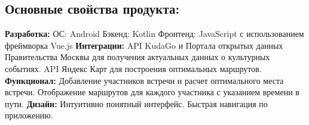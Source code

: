 \documentclass[a4paper,12pt]{extarticle}
\begin{document}
\subsection{Основные свойства продукта:}
\noindent
\textbf{Разработка:} 
\newline
ОС: Android
\newline
Бэкенд: Kotlin
\newline
Фронтенд: JavaScript с использованием фреймворка Vue.js
\newline
\textbf{Интеграции:}
\newline
API KudaGo и Портала открытых данных Правительства Москвы для получения актуальных данных о культурных 
событиях.
\newline
API Яндекс Карт для построения оптимальных маршрутов.
\newline
\textbf{Функционал:}
\newline
Добавление участников встречи и расчет оптимального места встречи.
\newline
Отображение маршрутов для каждого участника с указанием 
времени в пути.
\newline
\textbf{Дизайн:}
\newline
Интуитивно понятный интерфейс.
\newline
Быстрая навигация по приложению.
\newline
\end{document}
